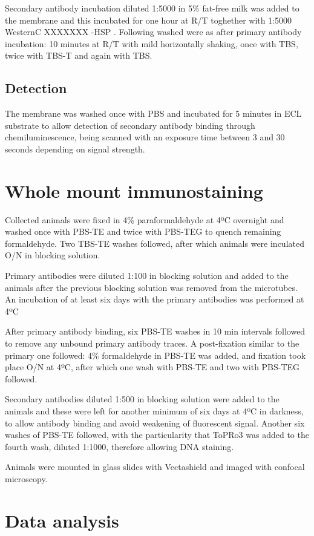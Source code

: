 \documentclass[11pt,twoside,a4paper]{report}
\begin{document}
			Secondary antibody incubation diluted 1:5000 in 5\% fat-free milk was added to the membrane and this incubated for one hour at R/T toghether with 1:5000 WesternC XXXXXXX -HSP . Following washed were as after primary antibody incubation: 10 minutes at R/T with mild horizontally shaking, once with TBS, twice with TBS-T and again with TBS.
			\subsection{Detection}
			The membrane was washed once with PBS and incubated for 5 minutes in ECL substrate to allow detection of secondary antibody binding through chemiluminescence, being scanned with an exposure time between 3 and 30 seconds depending on signal strength.
		
	\section{Whole mount immunostaining}
		Collected animals were fixed in 4\% paraformaldehyde at 4ºC overnight and washed once with PBS-TE and twice with PBS-TEG to quench remaining formaldehyde. Two TBS-TE washes followed, after which animals were inculated O/N in blocking solution.
		
		Primary antibodies were diluted 1:100 in blocking solution and added to the animals after the previous blocking solution was removed from the microtubes. An incubation of at least six days with the primary antibodies was performed at 4ºC
		
		After primary antibody binding, six PBS-TE washes in 10 min intervals followed to remove any unbound primary antibody traces. A post-fixation similar to the primary one followed: 4\% formaldehyde in PBS-TE was added, and fixation took place O/N at 4ºC, after which one wash with PBS-TE and two with PBS-TEG followed. 
		
		Secondary antibodies diluted 1:500 in blocking solution were added to the animals  and these were left for another minimum of six days at 4ºC in darkness, to allow antibody binding and avoid weakening of fluorescent signal. Another six washes of PBS-TE followed, with the particularity that ToPRo3 was added to the fourth wash, diluted 1:1000, therefore allowing DNA staining.
		
		Animals were mounted in glass slides with Vectashield and imaged with confocal microscopy.
		
	\section{Data analysis}
\end{document}
